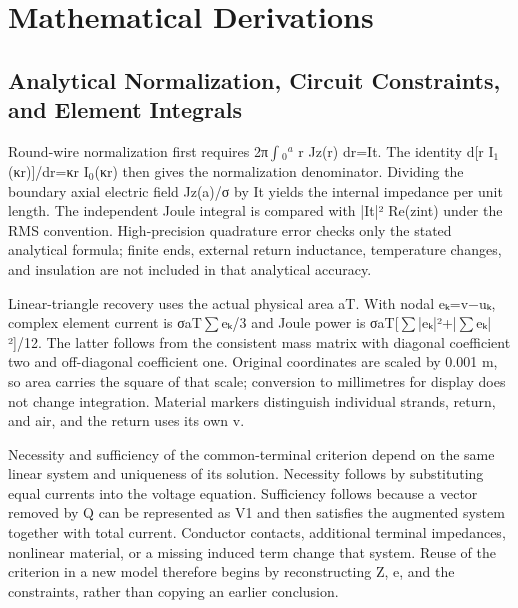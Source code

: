 \appendix
\section{Mathematical Derivations}
\label{chapter:A}

\hypertarget{A.report_derivation.heading}{}
\subsection{Analytical Normalization, Circuit Constraints, and Element Integrals}

\hypertarget{A.report_derivation.p1}{}
Round-wire normalization first requires 2π\(\int\)\(_0\)\(^a\) r Jz(r) dr=It. The identity d[r I\(_1\)(κr)]/dr=κr I\(_0\)(κr) then gives the normalization denominator. Dividing the boundary axial electric field Jz(a)/σ by It yields the internal impedance per unit length. The independent Joule integral is compared with |It|² Re(zint) under the RMS convention. High-precision quadrature error checks only the stated analytical formula; finite ends, external return inductance, temperature changes, and insulation are not included in that analytical accuracy.

\hypertarget{A.report_derivation.p2}{}
Linear-triangle recovery uses the actual physical area aT. With nodal eₖ=v−uₖ, complex element current is σaT\(\sum\)eₖ/3 and Joule power is σaT[\(\sum\)|eₖ|²+|\(\sum\)eₖ|²]/12. The latter follows from the consistent mass matrix with diagonal coefficient two and off-diagonal coefficient one. Original coordinates are scaled by 0.001 m, so area carries the square of that scale; conversion to millimetres for display does not change integration. Material markers distinguish individual strands, return, and air, and the return uses its own v.

\hypertarget{A.report_derivation.p3}{}
Necessity and sufficiency of the common-terminal criterion depend on the same linear system and uniqueness of its solution. Necessity follows by substituting equal currents into the voltage equation. Sufficiency follows because a vector removed by Q can be represented as V1 and then satisfies the augmented system together with total current. Conductor contacts, additional terminal impedances, nonlinear material, or a missing induced term change that system. Reuse of the criterion in a new model therefore begins by reconstructing Z, e, and the constraints, rather than copying an earlier conclusion.

